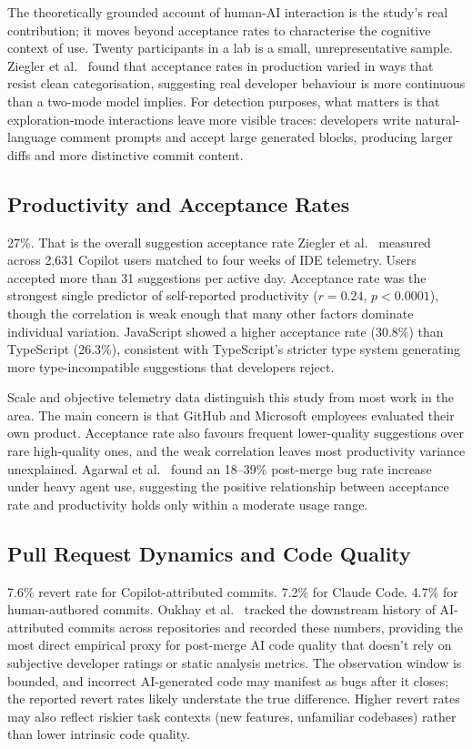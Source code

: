 The theoretically grounded account of human-AI interaction is the study's real contribution; it moves beyond acceptance rates to characterise the cognitive context of use. Twenty participants in a lab is a small, unrepresentative sample. Ziegler et al.~\cite{ziegler2022} found that acceptance rates in production varied in ways that resist clean categorisation, suggesting real developer behaviour is more continuous than a two-mode model implies. For detection purposes, what matters is that exploration-mode interactions leave more visible traces: developers write natural-language comment prompts and accept large generated blocks, producing larger diffs and more distinctive commit content.

\subsection{Productivity and Acceptance Rates}

27\%. That is the overall suggestion acceptance rate Ziegler et al.~\cite{ziegler2022} measured across 2,631 Copilot users matched to four weeks of IDE telemetry. Users accepted more than 31 suggestions per active day. Acceptance rate was the strongest single predictor of self-reported productivity ($r = 0.24$, $p < 0.0001$), though the correlation is weak enough that many other factors dominate individual variation. JavaScript showed a higher acceptance rate (30.8\%) than TypeScript (26.3\%), consistent with TypeScript's stricter type system generating more type-incompatible suggestions that developers reject.

Scale and objective telemetry data distinguish this study from most work in the area. The main concern is that GitHub and Microsoft employees evaluated their own product. Acceptance rate also favours frequent lower-quality suggestions over rare high-quality ones, and the weak correlation leaves most productivity variance unexplained. Agarwal et al.~\cite{agarwal2026} found an 18--39\% post-merge bug rate increase under heavy agent use, suggesting the positive relationship between acceptance rate and productivity holds only within a moderate usage range.

\subsection{Pull Request Dynamics and Code Quality}

7.6\% revert rate for Copilot-attributed commits. 7.2\% for Claude Code. 4.7\% for human-authored commits. Oukhay et al.~\cite{oukhay2026} tracked the downstream history of AI-attributed commits across repositories and recorded these numbers, providing the most direct empirical proxy for post-merge AI code quality that doesn't rely on subjective developer ratings or static analysis metrics. The observation window is bounded, and incorrect AI-generated code may manifest as bugs after it closes; the reported revert rates likely understate the true difference. Higher revert rates may also reflect riskier task contexts (new features, unfamiliar codebases) rather than lower intrinsic code quality.

